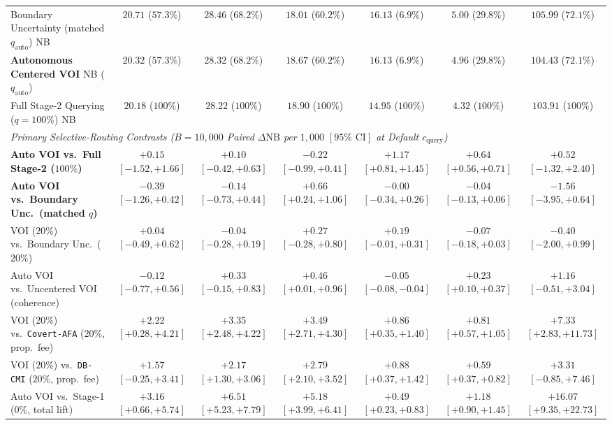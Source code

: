 \documentclass[11pt]{article}
\theoremstyle{remark}
\begin{document}
\begin{table}[t]
{\begin{tabular}{lcccccc}
Boundary Uncertainty (matched $q_{\text{auto}}$) NB & $20.71$ ($57.3\%$) & $28.46$ ($68.2\%$) & $18.01$ ($60.2\%$) & $16.13$ ($6.9\%$) & $5.00$ ($29.8\%$) & $105.99$ ($72.1\%$) \\
\textbf{Autonomous Centered VOI} NB ($q_{\text{auto}}$) & $\mathbf{20.32}$ ($57.3\%$) & $\mathbf{28.32}$ ($68.2\%$) & $\mathbf{18.67}$ ($60.2\%$) & $\mathbf{16.13}$ ($6.9\%$) & $\mathbf{4.96}$ ($29.8\%$) & $\mathbf{104.43}$ ($72.1\%$) \\
Full Stage-2 Querying ($q=100\%$) NB & $20.18$ ($100\%$) & $28.22$ ($100\%$) & $18.90$ ($100\%$) & $14.95$ ($100\%$) & $4.32$ ($100\%$) & $103.91$ ($100\%$) \\
\midrule
\multicolumn{7}{l}{\emph{Primary Selective-Routing Contrasts ($B=10{,}000$ Paired $\Delta\text{NB}$ per $1{,}000$ $[95\%\text{ CI}]$ at Default $c_{\text{query}}$)}} \\
\textbf{Auto VOI vs.\ Full Stage-2 ($100\%$)} & $+0.15$ $[-1.52,+1.66]$ & $+0.10$ $[-0.42,+0.63]$ & $-0.22$ $[-0.99,+0.41]$ & $\mathbf{+1.17}$ $[+0.81,+1.45]$ & $\mathbf{+0.64}$ $[+0.56,+0.71]$ & $+0.52$ $[-1.32,+2.40]$ \\
\textbf{Auto VOI vs.\ Boundary Unc.\ (matched $q$)} & $-0.39$ $[-1.26,+0.42]$ & $-0.14$ $[-0.73,+0.44]$ & $\mathbf{+0.66}$ $[+0.24,+1.06]$ & $-0.00$ $[-0.34,+0.26]$ & $-0.04$ $[-0.13,+0.06]$ & $-1.56$ $[-3.95,+0.64]$ \\
VOI ($20\%$) vs.\ Boundary Unc.\ ($20\%$) & $+0.04$ $[-0.49,+0.62]$ & $-0.04$ $[-0.28,+0.19]$ & $+0.27$ $[-0.28,+0.80]$ & $+0.19$ $[-0.01,+0.31]$ & $-0.07$ $[-0.18,+0.03]$ & $-0.40$ $[-2.00,+0.99]$ \\
Auto VOI vs.\ Uncentered VOI (coherence) & $-0.12$ $[-0.77,+0.56]$ & $+0.33$ $[-0.15,+0.83]$ & $\mathbf{+0.46}$ $[+0.01,+0.96]$ & $-0.05$ $[-0.08,-0.04]$ & $\mathbf{+0.23}$ $[+0.10,+0.37]$ & $+1.16$ $[-0.51,+3.04]$ \\
VOI ($20\%$) vs.\ \texttt{Covert-AFA} ($20\%$, prop.\ fee) & $\mathbf{+2.22}$ $[+0.28,+4.21]$ & $\mathbf{+3.35}$ $[+2.48,+4.22]$ & $\mathbf{+3.49}$ $[+2.71,+4.30]$ & $\mathbf{+0.86}$ $[+0.35,+1.40]$ & $\mathbf{+0.81}$ $[+0.57,+1.05]$ & $\mathbf{+7.33}$ $[+2.83,+11.73]$ \\
VOI ($20\%$) vs.\ \texttt{DB-CMI} ($20\%$, prop.\ fee) & $+1.57$ $[-0.25,+3.41]$ & $\mathbf{+2.17}$ $[+1.30,+3.06]$ & $\mathbf{+2.79}$ $[+2.10,+3.52]$ & $\mathbf{+0.88}$ $[+0.37,+1.42]$ & $\mathbf{+0.59}$ $[+0.37,+0.82]$ & $+3.31$ $[-0.85,+7.46]$ \\
Auto VOI vs.\ Stage-1 ($0\%$, total lift) & $+3.16$ $[+0.66,+5.74]$ & $+6.51$ $[+5.23,+7.79]$ & $+5.18$ $[+3.99,+6.41]$ & $+0.49$ $[+0.23,+0.83]$ & $+1.18$ $[+0.90,+1.45]$ & $+16.07$ $[+9.35,+22.73]$ \\

\end{tabular}}
\end{table}
\end{document}
